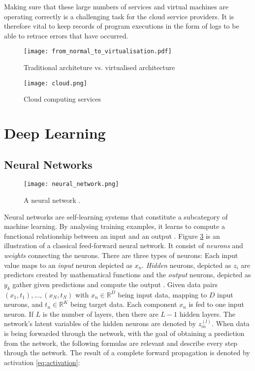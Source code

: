 Making sure that these large numbers of services and virtual machines are operating correctly is a challenging task for the cloud service providers. It is therefore vital to keep records of program executions in the form of logs to be able to retrace errors that have occurred.

\begin{figure}[h]
  \centering
  \texttt{[image: from\_normal\_to\_virtualisation.pdf]}\\
  \caption{Traditional architeture vs. virtualised architecture}
  \label{fig:virtualisation}
\end{figure}

\begin{figure}[h]
  \centering
  \texttt{[image: cloud.png]}\\
  \caption{Cloud computing services}
  \label{fig:cloud}
\end{figure}


\section{Deep Learning \label{sec:deep-learning}}
\subsection{Neural Networks \label{sec:neural-networks}}
\begin{figure}[h]
  \centering
  \texttt{[image: neural\_network.png]}\\
  \caption{A neural network \cite{hallmachinelearning}.}
  \label{fig:neural_network}
\end{figure}
Neural networks are self-learning systems that constitute a subcategory of machine learning. By analysing training examples, it learns to compute a functional relationship between an input and an output \cite{sibi2013analysis}. Figure \ref{fig:neural_network} is an illustration of a classical feed-forward neural network. It consist of \textit{neurons} and \textit{weights} connecting the neurons. There are three types of neurons: Each input value maps to an \textit{input} neuron depicted as $x_n$. \textit{Hidden} neurons, depicted as $z_i$ are predictors created by mathematical functions and the \textit{output} neurons, depicted as $y_k$ gather given predictions and compute the output \cite{hallmachinelearning}. Given data pairs $(x_1, t_1), ..., (x_N, t_N)$ with $x_n \in \mathbb{R}^D$ being input data, mapping to $D$ input neurons, and $t_n \in \mathbb{R}^K$ being target data. Each component $x_n$ is fed to one input neuron. If $L$ is the number of layers, then there are $L-1$ hidden layers. The network's latent variables of the hidden neurons are denoted by $z_m^{(l)}$. When data is being forwarded through the network, with the goal of obtaining a prediction from the network, the following formulas are relevant and describe every step through the network. The result of a complete forward propagation is denoted by activation \ref{eq:activation}:

